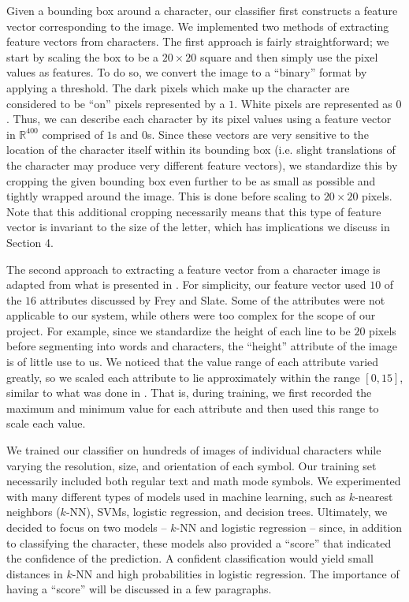 \documentclass[10pt]{IEEEtran}
\begin{document}
Given a bounding box around a character, our classifier first constructs a feature vector corresponding to the image. We implemented two methods of extracting feature vectors from characters. The first approach is fairly straightforward; we start by scaling the box to be a $20 \times 20$ square and then simply use the pixel values as features. To do so, we convert the image to a ``binary'' format by applying a threshold. The dark pixels which make up the character are considered to be ``on'' pixels represented by a $1$. White pixels are represented as $0$. Thus, we can describe each character by its pixel values using a feature vector in $\mathbb{R}^{400}$ comprised of $1$s and $0$s. Since these vectors are very sensitive to the location of the character itself within its bounding box (i.e. slight translations of the character may produce very different feature vectors), we standardize this by cropping the given bounding box even further to be as small as possible and tightly wrapped around the image. This is done before scaling to $20 \times 20$ pixels. Note that this additional cropping necessarily means that this type of feature vector is invariant to the size of the letter, which has implications we discuss in Section 4.

The second approach to extracting a feature vector from a character image is adapted from what is presented in \cite{2}. For simplicity, our feature vector used $10$ of the $16$ attributes discussed by Frey and Slate. Some of the attributes were not applicable to our system, while others were too complex for the scope of our project. For example, since we standardize the height of each line to be $20$ pixels before segmenting into words and characters, the ``height'' attribute of the image is of little use to us. We noticed that the value range of each attribute varied greatly, so we scaled each attribute to lie approximately within the range $[0,15]$, similar to what was done in \cite{2}. That is, during training, we first recorded the maximum and minimum value for each attribute and then used this range to scale each value.

We trained our classifier on hundreds of images of individual characters while varying the resolution, size, and orientation of each symbol. Our training set necessarily included both regular text and math mode symbols. We experimented with many different types of models used in machine learning, such as $k$-nearest neighbors ($k$-NN), SVMs, logistic regression, and decision trees. Ultimately, we decided to focus on two models -- $k$-NN and logistic regression -- since, in addition to classifying the character, these models also provided a ``score'' that indicated the confidence of the prediction. A confident classification would yield small distances in $k$-NN and high probabilities in logistic regression. The importance of having a ``score'' will be discussed in a few paragraphs.
\end{document}
